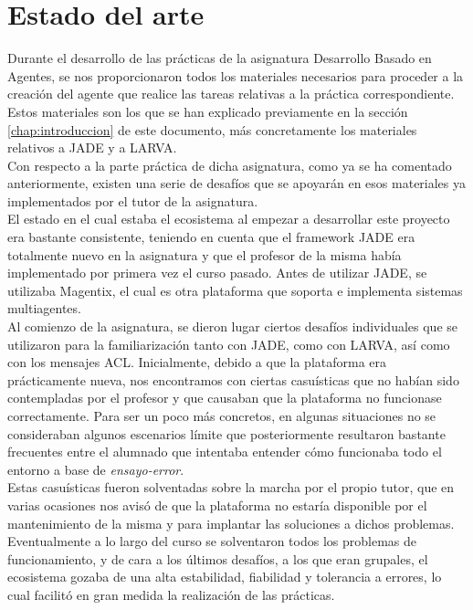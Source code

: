 \chapter{Estado del arte}

Durante el desarrollo de las prácticas de la asignatura Desarrollo Basado en Agentes, se nos proporcionaron todos los materiales necesarios para proceder a la creación del agente que realice las tareas relativas a la práctica correspondiente. Estos materiales son los que se han explicado previamente en la sección \ref{chap:introduccion} de este documento, más concretamente los materiales relativos a JADE y a LARVA.\\

Con respecto a la parte práctica de dicha asignatura, como ya se ha comentado anteriormente, existen una serie de desafíos que se apoyarán en esos materiales ya implementados por el tutor de la asignatura.\\

El estado en el cual estaba el ecosistema al empezar a desarrollar este proyecto era bastante consistente, teniendo en cuenta que el framework JADE era totalmente nuevo en la asignatura y que el profesor de la misma había implementado por primera vez el curso pasado. Antes de utilizar JADE, se utilizaba Magentix, el cual es otra plataforma que soporta e implementa sistemas multiagentes.\\

Al comienzo de la asignatura, se dieron lugar ciertos desafíos individuales que se utilizaron para la familiarización tanto con JADE, como con LARVA, así como con los mensajes ACL. Inicialmente, debido a que la plataforma era prácticamente nueva, nos encontramos con ciertas casuísticas que no habían sido contempladas por el profesor y que causaban que la plataforma no funcionase correctamente. Para ser un poco más concretos, en algunas situaciones no se consideraban algunos escenarios límite que posteriormente resultaron bastante frecuentes entre el alumnado que intentaba entender cómo funcionaba todo el entorno a base de \textit{ensayo-error}.\\

Estas casuísticas fueron solventadas sobre la marcha por el propio tutor, que en varias ocasiones nos avisó de que la plataforma no estaría disponible por el mantenimiento de la misma y para implantar las soluciones a dichos problemas. Eventualmente a lo largo del curso se solventaron todos los problemas de funcionamiento, y de cara a los últimos desafíos, a los que eran grupales, el ecosistema gozaba de una alta estabilidad, fiabilidad y tolerancia a errores, lo cual facilitó en gran medida la realización de las prácticas.\\

